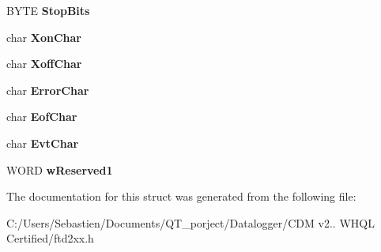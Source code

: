 \begin{DoxyCompactItemize}
\item 
\mbox{\label{struct___f_t_d_c_b_a26a8414df8e94f282714833f9776319a}} 
B\+Y\+TE {\bfseries Stop\+Bits}
\item 
\mbox{\label{struct___f_t_d_c_b_aee3e405df31d5b168110814d5529b014}} 
char {\bfseries Xon\+Char}
\item 
\mbox{\label{struct___f_t_d_c_b_a30a25a1c40525289b24b29f6593a6c51}} 
char {\bfseries Xoff\+Char}
\item 
\mbox{\label{struct___f_t_d_c_b_a0b8fa24da4dcdba892abd2c6cdb55707}} 
char {\bfseries Error\+Char}
\item 
\mbox{\label{struct___f_t_d_c_b_a6f0a84ef54dbc36123a40e05ba94aa4e}} 
char {\bfseries Eof\+Char}
\item 
\mbox{\label{struct___f_t_d_c_b_a579b4755ad4a7ea9c76ddaf5f548a460}} 
char {\bfseries Evt\+Char}
\item 
\mbox{\label{struct___f_t_d_c_b_a6775b20a593cc63edde243ed9605a028}} 
W\+O\+RD {\bfseries w\+Reserved1}
\end{DoxyCompactItemize}


The documentation for this struct was generated from the following file\+:\begin{DoxyCompactItemize}
\item 
C\+:/\+Users/\+Sebastien/\+Documents/\+Q\+T\+\_\+porject/\+Datalogger/\+C\+D\+M v2.. W\+H\+Q\+L Certified/ftd2xx.\+h\end{DoxyCompactItemize}
